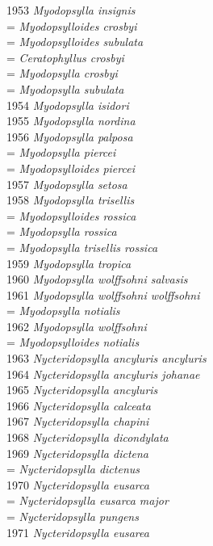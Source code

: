 \documentclass[
]{article}
\begin{document}
1953 \emph{Myodopsylla insignis}\\
= \emph{Myodopsylloides crosbyi}\\
= \emph{Myodopsylloides subulata}\\
= \emph{Ceratophyllus crosbyi}\\
= \emph{Myodopsylla crosbyi}\\
= \emph{Myodopsylla subulata}\\
1954 \emph{Myodopsylla isidori}\\
1955 \emph{Myodopsylla nordina}\\
1956 \emph{Myodopsylla palposa}\\
= \emph{Myodopsylla piercei}\\
= \emph{Myodopsylloides piercei}\\
1957 \emph{Myodopsylla setosa}\\
1958 \emph{Myodopsylla trisellis}\\
= \emph{Myodopsylloides rossica}\\
= \emph{Myodopsylla rossica}\\
= \emph{Myodopsylla trisellis rossica}\\
1959 \emph{Myodopsylla tropica}\\
1960 \emph{Myodopsylla wolffsohni salvasis}\\
1961 \emph{Myodopsylla wolffsohni wolffsohni}\\
= \emph{Myodopsylla notialis}\\
1962 \emph{Myodopsylla wolffsohni}\\
= \emph{Myodopsylloides notialis}\\
1963 \emph{Nycteridopsylla ancyluris ancyluris}\\
1964 \emph{Nycteridopsylla ancyluris johanae}\\
1965 \emph{Nycteridopsylla ancyluris}\\
1966 \emph{Nycteridopsylla calceata}\\
1967 \emph{Nycteridopsylla chapini}\\
1968 \emph{Nycteridopsylla dicondylata}\\
1969 \emph{Nycteridopsylla dictena}\\
= \emph{Nycteridopsylla dictenus}\\
1970 \emph{Nycteridopsylla eusarca}\\
= \emph{Nycteridopsylla eusarca major}\\
= \emph{Nycteridopsylla pungens}\\
1971 \emph{Nycteridopsylla eusarea}\\
\end{document}
